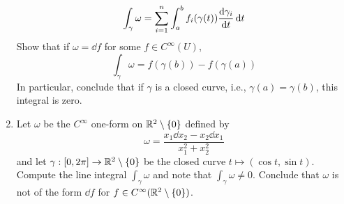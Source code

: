 \documentclass[../psets.tex]{subfiles}
\begin{document}
\begin{enumerate}[label={\textbf{2.1.\roman*.}}]
    \begin{equation*}
        \int_\gamma\omega = \sum_{i=1}^n\int_a^bf_i(\gamma(t))\dv{\gamma_i}{t}\dd{t}
    \end{equation*}
    Show that if $\omega=\dd{f}$ for some $f\in C^\infty(U)$,
    \begin{equation*}
        \int_\gamma\omega = f(\gamma(b))-f(\gamma(a))
    \end{equation*}
    In particular, conclude that if $\gamma$ is a closed curve, i.e., $\gamma(a)=\gamma(b)$, this integral is zero.
    \item Let $\omega$ be the $C^\infty$ one-form on $\mathbb{R}^2\setminus\{0\}$ defined by
    \begin{equation*}
        \omega = \frac{x_1\dd{x_2}-x_2\dd{x_1}}{x_1^2+x_2^2}
    \end{equation*}
    and let $\gamma:[0,2\pi]\to\mathbb{R}^2\setminus\{0\}$ be the closed curve $t\mapsto(\cos t,\sin t)$. Compute the line integral $\int_\gamma\omega$ and note that $\int_\gamma\omega\neq 0$. Conclude that $\omega$ is not of the form $\dd{f}$ for $f\in C^\infty(\mathbb{R}^2\setminus\{0\})$.
\end{enumerate}
\end{document}
